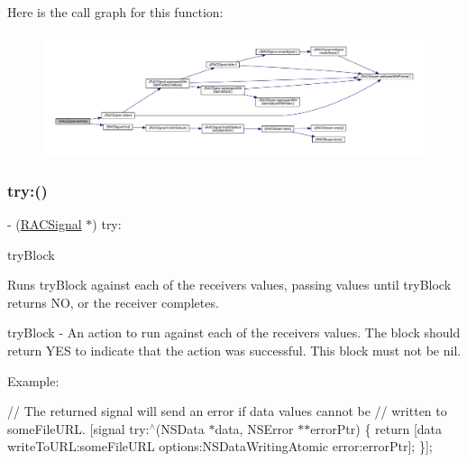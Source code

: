 Here is the call graph for this function\+:\nopagebreak
\begin{figure}[H]
\begin{center}
\leavevmode
\includegraphics[width=350pt]{interface_r_a_c_signal_a5b7a649ea4635f423b73cd4924652fe5_cgraph}
\end{center}
\end{figure}
\mbox{\label{interface_r_a_c_signal_ac65d7a1a19db9cb2f78c03781995bbe9}} 
\subsubsection{\texorpdfstring{try\+:()}{try:()}\hspace{0.1cm}{\footnotesize\ttfamily [1/3]}}
{\footnotesize\ttfamily -\/ (\mbox{\hyperlink{interface_r_a_c_signal}{R\+A\+C\+Signal}} $\ast$) try\+: \begin{DoxyParamCaption}\item[{(B\+O\+OL($^\wedge$)(id value, N\+S\+Error $\ast$$\ast$error\+Ptr))}]{try\+Block }\end{DoxyParamCaption}}

Runs {\ttfamily try\+Block} against each of the receiver\textquotesingle{}s values, passing values until {\ttfamily try\+Block} returns NO, or the receiver completes.

try\+Block -\/ An action to run against each of the receiver\textquotesingle{}s values. The block should return Y\+ES to indicate that the action was successful. This block must not be nil.

Example\+:

// The returned signal will send an error if data values cannot be // written to {\ttfamily some\+File\+U\+RL}. \mbox{[}signal try\+:$^\wedge$(N\+S\+Data $\ast$data, N\+S\+Error $\ast$$\ast$error\+Ptr) \{ return \mbox{[}data write\+To\+U\+RL\+:some\+File\+U\+RL options\+:N\+S\+Data\+Writing\+Atomic error\+:error\+Ptr\mbox{]}; \}\mbox{]};

